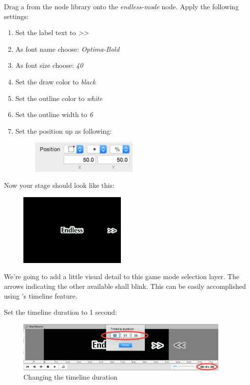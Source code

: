 \begin{leftbar}
Drag a \cclabel{} from the node library onto the \textit{endless-mode} node.
Apply the following settings:
\begin{enumerate}
  \item Set the label text to \textit{>>}
  \item As font name choose: \textit{Optima-Bold}
  \item As font size choose: \textit{40}
  \item Set the draw color to \textit{black}
  \item Set the outline color to \textit{white}
  \item Set the outline width to \textit{6}
  \item Set the position up as following: \begin{figure}[H]
										  \centering
										  \includegraphics[width=150pt]{images/Chapter7/arrow_label_position.png}
										  \end{figure}
\end{enumerate}
\end{leftbar}

Now your stage should look like this:
\begin{figure}[H]
\centering
\includegraphics[width=150pt]{images/Chapter7/endless_mode.png}
\end{figure}
We're going to add a little visual detail to this game mode selection layer. The
arrows indicating the other available shall blink. This can be easily
accomplished using \SB{}'s timeline feature. 

\begin{leftbar}
Set the timeline duration to 1 second:
\begin{figure}[H]
\centering
\includegraphics[width=300pt]{images/Chapter7/timeline_duration.png}
\caption{Changing the timeline duration}\label{fig:
timeline_duration}
\end{figure}
\end{leftbar}

